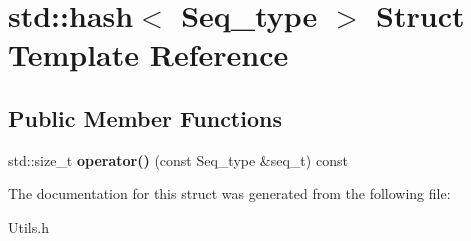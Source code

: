 \hypertarget{structstd_1_1hash_3_01Seq__type_01_4}{}\section{std\+:\+:hash$<$ Seq\+\_\+type $>$ Struct Template Reference}
\label{structstd_1_1hash_3_01Seq__type_01_4}
\subsection*{Public Member Functions}
\begin{DoxyCompactItemize}
\item 
\mbox{\label{structstd_1_1hash_3_01Seq__type_01_4_af25e2ed5d5ef1774104f39618eb6cd57}} 
std\+::size\+\_\+t {\bfseries operator()} (const Seq\+\_\+type \&seq\+\_\+t) const
\end{DoxyCompactItemize}


The documentation for this struct was generated from the following file\+:\begin{DoxyCompactItemize}
\item 
Utils.\+h\end{DoxyCompactItemize}
